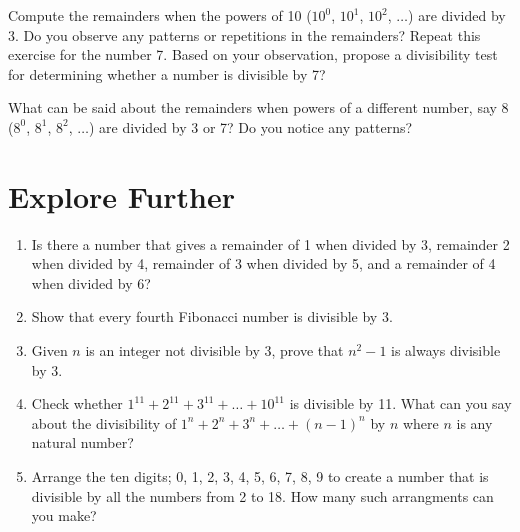 \documentclass[a4paper,12pt]{article}
\begin{document}
Compute the remainders when the powers of 10 ($10^0$, $10^1$, $10^2$, $\ldots$) are divided by 3. Do you observe any patterns or repetitions in the remainders? Repeat this exercise for the number 7. Based on your observation, propose a divisibility test for determining whether a number is divisible by 7?

What can be said about the remainders when powers of a different number, say 8 ($8^0$, $8^1$, $8^2$, $\ldots$) are divided by 3 or 7? Do you notice any patterns?
\newpage
\section*{Explore Further}
\begin{enumerate}
    \item Is there a number that gives a remainder of 1 when divided by 3, remainder 2 when divided by 4, remainder of 3 when divided by 5, and a remainder of 4 when divided by 6?  
\item Show that every fourth Fibonacci number is divisible by 3.
\item Given $n$ is an integer not divisible by 3, prove that $n^2-1$ is always divisible by 3.
\item Check whether $1^{11} + 2^{11} + 3^{11} + \ldots + 10^{11}$ is divisible by 11. What can you say about the divisibility of $1^n + 2^n + 3^n + \ldots + (n-1)^n$ by $n$ where $n$ is any natural number?
\item Arrange the ten digits; 0, 1, 2, 3, 4, 5, 6, 7, 8, 9 to create a number that is divisible by all the numbers from 2 to 18. How many such arrangments can you make?
\end{enumerate}
\end{document}
